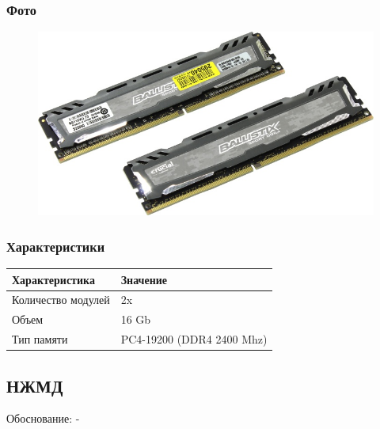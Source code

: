 \documentclass[a4paper]{article}
\begin{document}
\subsubsection{Фото}
\begin{figure}[H]
\centering
\includegraphics[scale=0.3]{ram.jpg} 
\end{figure}
\subsubsection{Характеристики}
\begin{table}[H]
    \centering
    \begin{tabular}{|l|l|}
    \hline
    Характеристика & Значение \\
    \hline
    Количество модулей & 2x \\
    Объем & 16 Gb \\
    Тип памяти & PC4-19200 (DDR4 2400 Mhz) \\
    \hline
\end{tabular}
\end{table}

\subsection{НЖМД}
Обоснование: -
\end{document}
